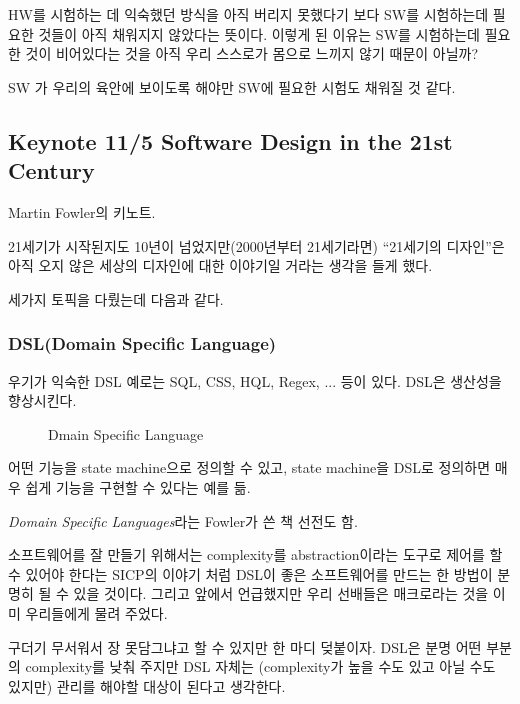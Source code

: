 \documentclass[a4paper]{article}
\begin{document}
HW를 시험하는 데 익숙했던 방식을 아직 버리지 못했다기 보다 SW를
시험하는데 필요한 것들이 아직 채워지지 않았다는 뜻이다. 이렇게 된
이유는 SW를 시험하는데 필요한 것이 비어있다는 것을 아직 우리 스스로가
몸으로 느끼지 않기 때문이 아닐까?
 
SW 가 우리의 육안에 보이도록 해야만 SW에 필요한 시험도 채워질 것 같다.
 
\subsection{Keynote 11/5 Software Design in the 21st Century}
 
Martin Fowler의 키노트.
 
21세기가 시작된지도 10년이 넘었지만(2000년부터 21세기라면) ``21세기의
디자인''은 아직 오지 않은 세상의 디자인에 대한 이야기일 거라는 생각을
들게 했다.
 
세가지 토픽을 다뤘는데 다음과 같다.
 
\subsubsection{DSL(Domain Specific Language)}
 
우기가 익숙한 DSL 예로는 SQL, CSS, HQL, Regex, ... 등이 있다. DSL은 생산성을 향상시킨다.

\begin{figure}[t]
    \begin{Frame}
        \begin{center}
        \end{center}
    \end{Frame}
    \caption{Dmain Specific Language}
    \label{dsl}
\end{figure}
 
어떤 기능을 state machine으로 정의할 수 있고, state machine을 DSL로
정의하면 매우 쉽게 기능을 구현할 수 있다는 예를 듦.
 
\textit{Domain Specific Languages}라는 Fowler가 쓴 책 선전도 함.
 
소프트웨어를 잘 만들기 위해서는 complexity를 abstraction이라는 도구로
제어를 할 수 있어야 한다는 SICP의 이야기 처럼 DSL이 좋은 소프트웨어를
만드는 한 방법이 분명히 될 수 있을 것이다. 그리고 앞에서 언급했지만
우리 선배들은 매크로라는 것을 이미 우리들에게 물려 주었다.
 
구더기 무서워서 장 못담그냐고 할 수 있지만 한 마디 덪붙이자. DSL은 분명
어떤 부분의 complexity를 낮춰 주지만 DSL 자체는 (complexity가 높을 수도
있고 아닐 수도 있지만) 관리를 해야할 대상이 된다고 생각한다.
 
\end{document}
